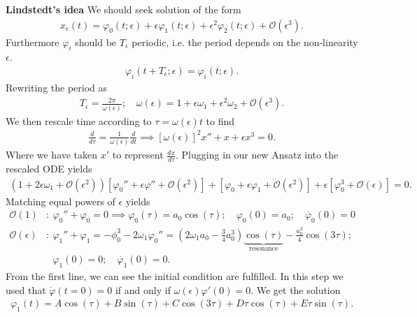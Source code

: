 \begin{ex}
\noindent
\textbf{Lindstedt's idea} We should seek solution of the form
\begin{align}
	x_{\epsilon}(t) = \varphi_0(t;\epsilon) + \epsilon \varphi_1 (t;\epsilon) + \epsilon^2 \varphi_2(t;\epsilon) + \mathcal{O}(\epsilon^3).
\end{align}
Furthermore $\varphi_i$ should be $T_\epsilon$ periodic, i.e. the period depends on the non-linearity $\epsilon$.
\begin{align}
	\varphi_i(t+T_\epsilon; \epsilon) = \varphi_i(t;\epsilon).
\end{align}
Rewriting the period as
\begin{align}
	T_\epsilon = \frac{2 \pi }{\omega(\epsilon)}; \quad \omega(\epsilon) = 1 + \epsilon \omega_1 + \epsilon^2 \omega_2 + \mathcal{O}(\epsilon^3).
\end{align}
We then rescale time according to $\tau = \omega(\epsilon) t$ to find
\begin{align}
	\frac{d}{d\tau} = \frac{1}{\omega(\epsilon)} \frac{d}{dt} \implies 
	\boxed{[\omega(\epsilon)]^2 x'' + x + \epsilon x^3 = 0.}
\end{align}
Where we have taken $x'$ to represent $\frac{dx}{d\tau}$. Plugging in our new Ansatz into the rescaled ODE yields
\begin{align}
	\left( 1 + 2 \epsilon \omega_1 + \mathcal{O}(\epsilon^2) \right) \left[ \varphi_0'' + \epsilon \varphi'' + \mathcal{O}(\epsilon^2) \right] + \left[ \varphi_0 + \epsilon \varphi_1 + \mathcal{O}(\epsilon^2) \right] + \epsilon \left[\varphi_0^{3} + \mathcal{O}(\epsilon) \right] = 0.
\end{align}
Matching equal powers of $\epsilon$ yields
\begin{align}
	\mathcal{O}(1)&:\ \varphi_0'' + \varphi_0 = 0 \implies \varphi_0(\tau) = a_0 \cos(\tau);\quad \varphi_0(0)=a_0;\quad \dot{\varphi_0}(0) = 0 \\
	\mathcal{O}(\epsilon)&:\ \varphi_1'' + \varphi_1 = - \phi_0^{3} - 2\omega_1 \varphi_{0}'' = 
	\left(2 \omega_1 a_0 - \frac{3}{4}a_0^{3}\right) \underbrace{\cos (\tau)}_{ \textrm{resonance} } - \frac{a_0^{3}}{4} \cos(3 \tau); \\
			     &\phantom{:}\ \varphi_1(0)=0; \quad \dot{\varphi_1}(0) = 0. 
\end{align}
From the first line, we can see the initial condition are fulfilled. In this step we used that $\dot{\varphi}(t=0) = 0$ if and only if $\omega(\epsilon)\varphi '(0) = 0$. We get the solution
\begin{align}
	\varphi_1(t) = A \cos(\tau) + B \sin(\tau) + C \cos(3\tau) + D\tau \cos(\tau) + E \tau \sin(\tau).

\end{align}
\end{ex}

